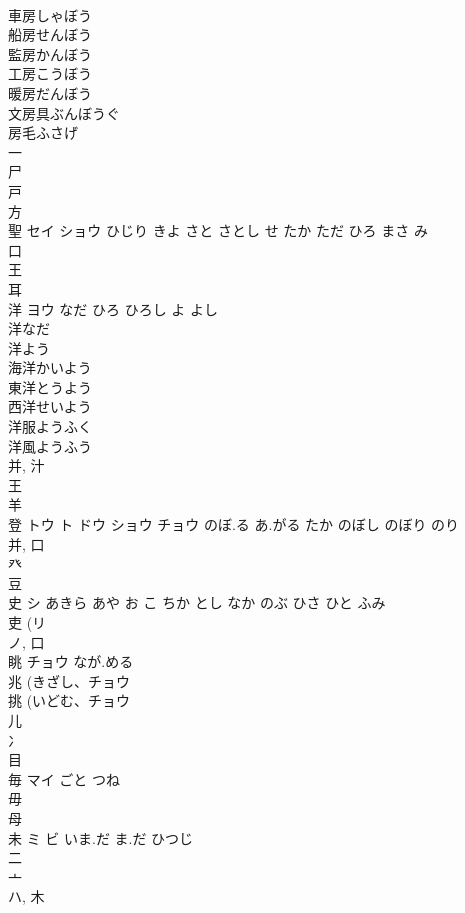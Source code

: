 \documentclass[8pt]{extreport}
\begin{document}
\begin{CJK}{UTF8}{min}
\\	車房しゃぼう
\\	船房せんぼう
\\	監房かんぼう
\\	工房こうぼう
\\	暖房だんぼう
\\	文房具ぶんぼうぐ
\\	房毛ふさげ
\\	一 
\\	尸 
\\	戸 
\\	方 
\\	聖	セイ ショウ	ひじり きよ さと さとし せ たか ただ ひろ まさ み	
\\	口 
\\	王 
\\	耳 
\\	洋	ヨウ	なだ ひろ ひろし よ よし	
\\	洋なだ
\\	洋よう
\\	海洋かいよう
\\	東洋とうよう
\\	西洋せいよう
\\	洋服ようふく
\\	洋風ようふう
\\	并, 汁 
\\	王 
\\	羊 
\\	登	トウ ト ドウ ショウ チョウ	のぼ.る あ.がる たか のぼし のぼり のり	
\\	并, 口 
\\	癶 
\\	豆 
\\	史	シ	あきら あや お こ ちか とし なか のぶ ひさ ひと ふみ	
\\	吏 (リ 
\\	ノ, 口 
\\	眺	チョウ	なが.める	
\\	兆 (きざし、チョウ 
\\	挑 (いどむ、チョウ 
\\	儿 
\\	冫 
\\	目 
\\	毎	マイ	ごと つね	
\\	毋 
\\	母 
\\	未	ミ ビ	いま.だ ま.だ ひつじ	
\\	二 
\\	亠 
\\	ハ, 木 

\end{CJK}
\end{document}
